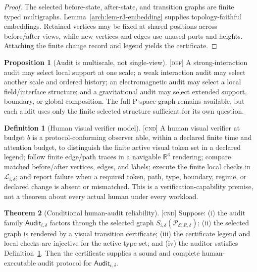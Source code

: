 \documentclass[11pt]{article}
\newcommand{\Pspace}{\ensuremath{\mathcal{P}}}
\newcommand{\Audit}{\ensuremath{\mathsf{Audit}}}
\newcommand{\Defn}{\textsc{[def]}}
\newcommand{\Cnd}{\textsc{[cnd]}}
\theoremstyle{definition}
\newtheorem{sdefinition}{Definition}
\newtheorem{sproposition}{Proposition}
\newtheorem{stheorem}[sdefinition]{Theorem}
\begin{document}
\begin{proof}
The selected before-state, after-state, and transition graphs are finite typed
multigraphs. Lemma~\ref{arch:lem-r3-embedding} supplies topology-faithful
embeddings. Retained vertices may be fixed at shared positions across before/after
views, while new vertices and edges use unused ports and heights. Attaching the
finite change record and legend yields the certificate.
\end{proof}

\begin{sproposition}[Audit is multiscale, not single-view]
\label{arch:prop-multiscale}
\Defn{} A strong-interaction audit may select local support at one scale; a weak
interaction audit may select another scale and ordered history; an electromagnetic
audit may select a local field/interface structure; and a gravitational audit may
select extended support, boundary, or global composition. The full P-space graph
remains available, but each audit uses only the finite selected structure sufficient
for its own question.
\end{sproposition}

\begin{sdefinition}[Human visual verifier model]
\label{arch:def-human-verifier}
\Cnd{} A human visual verifier at budget $b$ is a protocol-conforming observer able,
within a declared finite time and attention budget, to distinguish the finite active
visual token set in a declared legend; follow finite edge/path traces in a
navigable $\mathbb R^3$ rendering; compare matched before/after vertices, edges,
and labels; execute the finite local checks in $\mathcal L_{i,\delta}$; and report
failure when a required token, path, type, boundary, regime, or declared change is
absent or mismatched. This is a verification-capability premise, not a theorem
about every actual human under every workload.
\end{sdefinition}

\begin{stheorem}[Conditional human-audit reliability]
\label{arch:thm-human-audit}
\Cnd{} Suppose: (i) the audit family $\Audit_{i,\delta}$ factors through the
selected graph $S_{i,\delta}(\Pspace_{\mathcal E;R,\delta})$; (ii) the selected
graph is rendered by a visual transition certificate; (iii) the certificate legend
and local checks are injective for the active type set; and (iv) the auditor
satisfies Definition~\ref{arch:def-human-verifier}. Then the certificate supplies
a sound and complete human-executable audit protocol for $\Audit_{i,\delta}$.
\end{stheorem}
\end{document}

